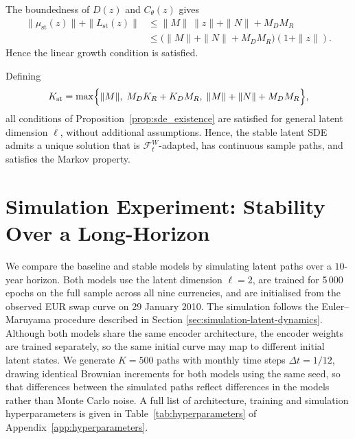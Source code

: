 \begin{description}[
    style=unboxed,
    leftmargin=0pt,
    labelindent=0pt,
    labelsep=0.5em
]
\item[Linear growth.]
The boundedness of $D(z)$ and $C_\theta(z)$ gives
\[
\begin{aligned}
\|\mu_{\mathrm{st}}(z)\|+\|L_{\mathrm{st}}(z)\|
&\leq
\|M\|\,\|z\|+\|N\|+M_DM_R \\
&\leq
\bigl(\|M\|+\|N\|+M_DM_R\bigr)(1+\|z\|).
\end{aligned}
\]
Hence the linear growth condition is satisfied.

\end{description}


Defining
\[
K_{\mathrm{st}}
=
\max\Bigl\{
\|M\|,\;
M_DK_R+K_DM_R,\;
\|M\|+\|N\|+M_DM_R
\Bigr\},
\]
all conditions of Proposition~\ref{prop:sde_existence} are satisfied for general latent dimension $\ell$, without additional assumptions. Hence, the stable latent SDE admits a unique solution that is $\mathcal{F}_t^W$-adapted, has continuous sample paths, and satisfies the Markov property.

\section{Simulation Experiment: Stability Over a Long-Horizon }
\label{sec:sim_evidence}

We compare the baseline and stable models by simulating latent paths over a $10$-year horizon. Both models use the latent dimension \(\ell=2\), are trained for 5\,000 epochs on the full sample across all nine currencies, and are initialised from the observed EUR swap curve on 29 January 2010. The simulation follows the Euler--Maruyama procedure described in Section \ref{sec:simulation-latent-dynamics}. Although both models share the same encoder architecture, the encoder weights are trained separately, so the same initial curve may map to different initial latent states. We generate $K=500$ paths with monthly time steps $\Delta t=1/12$, drawing identical Brownian increments for both models using the same seed, so that differences between the simulated paths reflect differences in the models rather than Monte Carlo noise. A full list of architecture, training and simulation hyperparameters is
given in Table~\ref{tab:hyperparameters} of Appendix~\ref{app:hyperparameters}.

